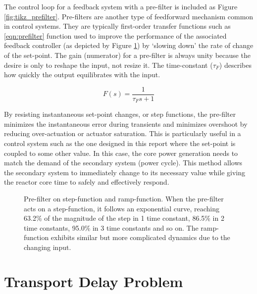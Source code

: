 The control loop for a feedback system with a pre-filter is included as Figure \ref{fig:tikz_prefilter}. Pre-filters are another type of feedforward mechanism common in control systems. They are typically first-order transfer functions such as \ref{eqn:prefilter} function used to improve the performance of the associated feedback controller (as depicted by Figure \ref{fig:pgf_prefilter}) by `slowing down' the rate of change of the set-point. The gain (numerator) for a pre-filter is always unity because the desire is only to reshape the input, not resize it. The time-constant ($\tau_F$) describes how quickly the output equilibrates with the input. 

\begin{equation}\label{eqn:prefilter}
    F(s)=\frac{1}{\tau_F s+1}    
\end{equation}

By resisting instantaneous set-point changes, or step functions, the pre-filter minimizes the instantaneous error during transients and minimizes overshoot by reducing over-actuation or actuator saturation.  This is particularly useful in a control system such as the one designed in this report where the set-point is coupled to some other value. In this case, the core power generation needs to match the demand of the secondary system (\eg power cycle). This method allows the secondary system to immediately change to its necessary value while giving the reactor core time to safely and effectively respond. 

\begin{figure}[h!]
    \centering
    \qquad
    \caption[Pre-filter on (a) step-function and (b) ramp-function]{Pre-filter on step-function and ramp-function. When the pre-filter acts on a step-function, it follows an exponential curve, reaching 63.2\% of the magnitude of the step in 1 time constant, 86.5\% in 2 time constants, 95.0\% in 3 time constants and so on. The ramp-function exhibits similar but more complicated dynamics due to the changing input.}
    \label{fig:pgf_prefilter}
\end{figure}

\section{Transport Delay Problem}

